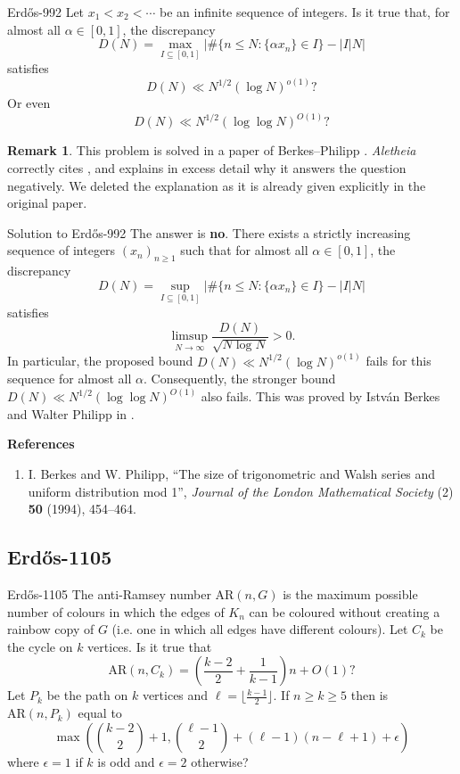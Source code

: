 \documentclass{article}
\theoremstyle{plain}
\theoremstyle{definition}
\newtheorem{remark}{Remark}[section]
\newcommand{\Aletheia}{\emph{Aletheia}}
\begin{document}
\begin{problem}{Erdős-992 \cite{Er64}}
    Let $x_1<x_2<\cdots$ be an infinite sequence of integers. Is it true that, for almost all $\alpha \in [0,1]$, the discrepancy\[D(N)=\max_{I\subseteq [0,1]} \lvert \#\{ n\leq N : \{ \alpha x_n\}\in I\} - \lvert I\rvert N\rvert\]satisfies\[D(N) \ll N^{1/2}(\log N)^{o(1)}?\]Or even\[D(N)\ll N^{1/2}(\log\log N)^{O(1)}?\]
\end{problem}

\begin{remark} This problem is solved in a paper of Berkes--Philipp \cite{BP94}. {\Aletheia} correctly cites \cite{BP94}, and explains in excess detail why it answers the question negatively. We deleted the explanation as it is already given explicitly in the original paper. 
\end{remark}

\begin{solution}{Solution to Erdős-992}
    The answer is \textbf{no}. There exists a strictly increasing sequence of integers $(x_n)_{n \ge 1}$ such that for almost all $\alpha \in [0,1]$, the discrepancy
    \[ D(N) = \sup_{I\subseteq [0,1]} \lvert \#\{ n\leq N : \{ \alpha x_n\}\in I\} - \lvert I\rvert N\rvert \]
    satisfies
    \[ \limsup_{N \to \infty} \frac{D(N)}{\sqrt{N \log N}} > 0. \]
    In particular, the proposed bound $D(N) \ll N^{1/2}(\log N)^{o(1)}$ fails for this sequence for almost all $\alpha$. Consequently, the stronger bound $D(N) \ll N^{1/2}(\log\log N)^{O(1)}$ also fails.
This was proved by István Berkes and Walter Philipp in \cite{BP94}.

\textbf{References}
\begin{enumerate}
    \item \cite{BP94} I. Berkes and W. Philipp, ``The size of trigonometric and Walsh series and uniform distribution mod 1'', \textit{Journal of the London Mathematical Society} (2) \textbf{50} (1994), 454–464.
\end{enumerate}


\end{solution}




\subsection{Erdős-1105}

\begin{problem}{Erdős-1105 \cite{ESS75}}
    The anti-Ramsey number $\mathrm{AR}(n,G)$ is the maximum possible number of colours in which the edges of $K_n$ can be coloured without creating a rainbow copy of $G$ (i.e. one in which all edges have different colours). Let $C_k$ be the cycle on $k$ vertices. Is it true that\[\mathrm{AR}(n,C_k)=\left(\frac{k-2}{2}+\frac{1}{k-1}\right)n+O(1)?\]Let $P_k$ be the path on $k$ vertices and $\ell=\lfloor\frac{k-1}{2}\rfloor$. If $n\geq k\geq 5$ then is $\mathrm{AR}(n,P_k)$ equal to\[\max\left(\binom{k-2}{2}+1, \binom{\ell-1}{2}+(\ell-1)(n-\ell+1)+\epsilon\right)\]where $\epsilon=1$ if $k$ is odd and $\epsilon=2$ otherwise?
\end{problem}
\end{document}
